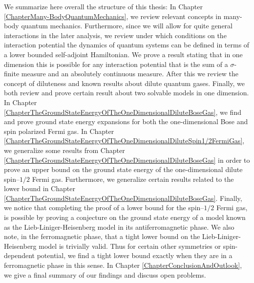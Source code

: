 We summarize here overall the structure of this thesis: In Chapter \ref{ChapterMany-BodyQuantumMechanics}, we review relevant concepts in many-body quantum mechanics. Furthermore, since we will allow for quite general interactions in the later analysis, we review under which conditions on the interaction potential the dynamics of quantum systems can be defined in terms of a lower bounded self-adjoint Hamiltonian. We prove a result stating that in one dimension this is possible for any interaction potential that is the sum of a $ \sigma $-finite measure and an absolutely continuous measure. After this we review the concept of diluteness and known results about dilute quantum gases. Finally, we both review and prove certain result about two solvable models in one dimension. In Chapter \ref{ChapterTheGroundStateEnergyOfTheOneDimensionalDiluteBoseGas}, we find and prove ground state energy expansions for both the one-dimensional Bose and spin polarized Fermi gas. In Chapter \ref{ChapterTheGroundStateEnergyOfTheOneDimensionalDiluteSpin1/2FermiGas}, we generalize some results from Chapter \ref{ChapterTheGroundStateEnergyOfTheOneDimensionalDiluteBoseGas} in order to prove an upper bound on the ground state energy of the one-dimensional dilute spin--$ 1/2 $ Fermi gas. Furthermore, we generalize certain results related to the lower bound in Chapter \ref{ChapterTheGroundStateEnergyOfTheOneDimensionalDiluteBoseGas}. Finally, we notice that completing the proof of a lower bound for the spin--$ 1/2 $ Fermi gas, is possible by proving a conjecture on the ground state energy of a model known as the Lieb-Liniger-Heisenberg model in its antiferromagnetic phase. We also note, in the ferromagnetic phase, that a tight lower bound on the Lieb-Liniger-Heisenberg model is trivially valid. Thus for certain other symmetries or spin-dependent potential, we find a tight lower bound exactly when they are in a ferromagnetic phase in this sense.
In Chapter \ref{ChapterConclusionAndOutlook}, we give a final summary of our findings and discuss open problems.

